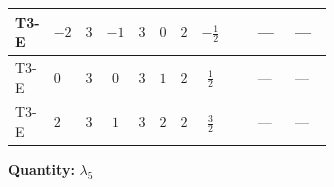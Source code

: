 \documentclass[8pt]{article}
\begin{document}
\begin{landscape}
\begin{longtable}{@{}llcccccc >{\raggedright\arraybackslash}p{0.21\linewidth} >{\raggedright\arraybackslash}p{0.21\linewidth} >{\raggedright\arraybackslash}p{0.21\linewidth}@{}}
\midrule
T3-E & $-2$ & $3$ & $-1$ & $3$ & $0$ & $2$ & $-\frac{1}{2}$ & \scriptsize\adjustbox{max width=\linewidth}{$\begin{gathered} +4 {\lambda_{HS_2}^{(1)}} {\lambda_5}\end{gathered}$} & --- & --- \\
\midrule
T3-E & $0$ & $3$ & $0$ & $3$ & $1$ & $2$ & $\frac{1}{2}$ & \scriptsize\adjustbox{max width=\linewidth}{$\begin{gathered} +4 {\lambda_{HS_2}^{(1)}} {\lambda_5}\end{gathered}$} & --- & --- \\
\midrule
T3-E & $2$ & $3$ & $1$ & $3$ & $2$ & $2$ & $\frac{3}{2}$ & \scriptsize\adjustbox{max width=\linewidth}{$\begin{gathered} +4 {\lambda_{HS_2}^{(1)}} {\lambda_5}\end{gathered}$} & --- & --- \\
\midrule
\bottomrule
\end{longtable}
\clearpage
\noindent\textbf{Quantity: }$\lambda_5$\par\smallskip

\end{landscape}
\end{document}
